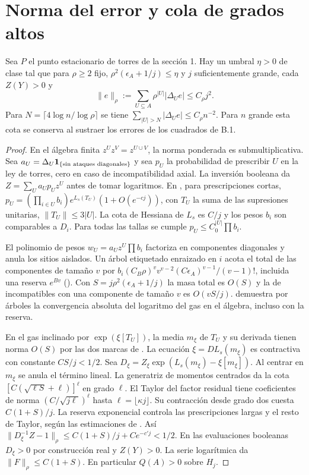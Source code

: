 \section{Norma del error y cola de grados altos}
\begin{proposicion}\label{prop:n}
Sea \(P\) el punto estacionario de torres de la sección 1. Hay un umbral \(\eta>0\) de
clase tal que para \(\rho\ge2\) fijo, \(\rho^2(\epsilon_A+1/j)\le\eta\) y \(j\)
suficientemente grande, cada \(Z(Y)>0\) y
\[
 \|e\|_\rho:=\sum_{U\subseteq A}\rho^{|U|}|\Delta_Ue|\le C_\rho j^2.
\]
Para \(N=\lceil4\log n/\log\rho\rceil\) se tiene
\(\sum_{|U|>N}|\Delta_Ue|\le C_\rho n^{-2}\). Para \(n\) grande esta cota se
conserva al sustraer los errores de los cuadrados de B.1.
\end{proposicion}
\begin{proof}
En el álgebra finita \(z^U z^V=z^{U\cup V}\), la norma ponderada es submultiplicativa.
Sea \(a_U=\Delta_U{\bf1}_{\{\text{sin ataques diagonales}\}}\) y sea \(p_U\) la
probabilidad de prescribir \(U\) en la ley de torres, cero en caso de
incompatibilidad axial. La inversión booleana da \(Z=\sum_U a_U p_U z^U\)
antes de tomar logaritmos. En , para prescripciones cortas,
\(p_U=(\prod_{i\in U}b_i)e^{L_s(T_U)}(1+O(e^{-cj}))\),
con \(T_U\) la suma de las supresiones unitarias, \(\|T_U\|\le3|U|\).
La cota de Hessiana de \(L_s\) es \(C/j\) y los pesos \(b_i\) son comparables a \(D_i\).
Para todas las tallas se cumple \(p_U\le C_0^{|U|}\prod b_i\).

El polinomio de pesos \(w_U=a_Uz^U\prod b_i\) factoriza en componentes diagonales
y anula los sitios aislados. Un árbol etiquetado enraizado en \(i\) acota el total
de las componentes de tamaño \(v\) por
\(b_i(C_B\rho)^v v^{v-2}(C\epsilon_A)^{v-1}/(v-1)!\),
incluida una reserva \(e^{Bv}\) ().
Con \(S=j\rho^2(\epsilon_A+1/j)\) la masa total es \(O(S)\) y la de incompatibles
con una componente de tamaño \(v\) es \(O(vS/j)\).  demuestra por árboles
la convergencia absoluta del logaritmo del gas en el álgebra, incluso con la reserva.

En el gas inclinado por \(\exp(\xi[T_U])\), la media \(m_\xi\) de \(T_U\) y su derivada
tienen norma \(O(S)\) por las dos marcas de . La ecuación
\(\xi=DL_s(m_\xi)\) es contractiva con constante \(CS/j<1/2\).
Sea \(D_\xi=Z_\xi\exp(L_s(m_\xi)-\xi[m_\xi])\). Al centrar en \(m_\xi\) se
anula el término lineal. La generatriz de momentos centrados da la cota
\([C(\sqrt{\ell S}+\ell)]^\ell\) en grado \(\ell\). El Taylor del factor residual
tiene coeficientes de norma \((C/\sqrt{j\ell})^\ell\) hasta \(\ell=\lfloor\kappa j\rfloor\).
Su contracción desde grado dos cuesta \(C(1+S)/j\). La reserva exponencial controla
las prescripciones largas y el resto de Taylor, según las estimaciones de .
Así \(\|D_\xi^{-1} Z-1\|_\rho\le C(1+S)/j+Ce^{-c'j}<1/2\). En las evaluaciones
booleanas \(D_\xi>0\) por construcción real y \(Z(Y)>0\). La serie logarítmica da
\(\|F\|_\rho\le C(1+S)\). En particular \(Q(A)>0\) sobre \(H_j\).


\end{proof}
